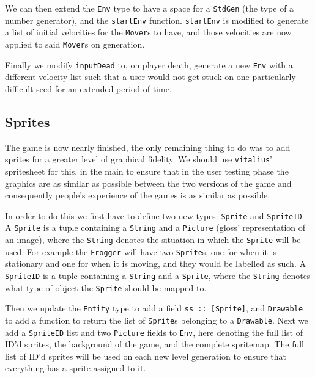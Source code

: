 \documentclass[12pt, a4paper]{report}
\begin{document}
\par

We can then extend the \verb|Env| type to have a space for a \verb|StdGen| (the type of a number generator), and the \verb|startEnv| function.
\verb|startEnv| is modified to generate a list of initial velocities for the \verb|Mover|s to have, and those velocities are now applied to said \verb|Mover|s on generation.

\par

Finally we modify \verb|inputDead| to, on player death, generate a new \verb|Env| with a different velocity list such that a user would not get stuck on one particularly difficult seed for an extended period of time.

\subsection{Sprites}

The game is now nearly finished, the only remaining thing to do was to add sprites for a greater level of graphical fidelity.
We should use \verb|vitalius|' spritesheet for this, in the main to ensure that in the user testing phase the graphics are as similar as possible between the two versions of the game and consequently people's experience of the games is as similar as possible.

\par

In order to do this we first have to define two new types: \verb|Sprite| and \verb|SpriteID|.
A \verb|Sprite| is a tuple containing a \verb|String| and a \verb|Picture| (gloss' representation of an image), where the \verb|String| denotes the situation in which the \verb|Sprite| will be used.
For example the \verb|Frogger| will have two \verb|Sprite|s, one for when it is stationary and one for when it is moving, and they would be labelled as such.
A \verb|SpriteID| is a tuple containing a \verb|String| and a \verb|Sprite|, where the \verb|String| denotes what type of object the \verb|Sprite| should be mapped to.

\par

Then we update the \verb|Entity| type to add a field \verb|ss :: [Sprite]|, and \verb|Drawable| to add a function to return the list of \verb|Sprite|s belonging to a \verb|Drawable|.
Next we add a \verb|SpriteID| list and two \verb|Picture| fields to \verb|Env|, here denoting the full list of ID'd sprites, the background of the game, and the complete spritemap.
The full list of ID'd sprites will be used on each new level generation to ensure that everything has a sprite assigned to it.
\end{document}
